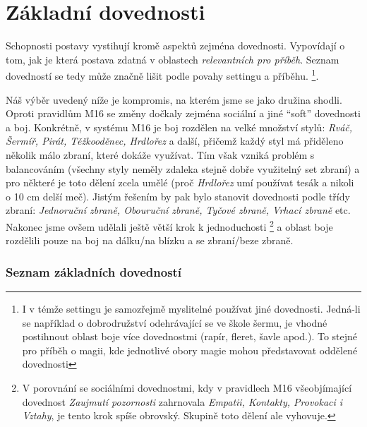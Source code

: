 \chapter{Základní dovednosti}
\label{chap:dovednosti}

Schopnosti postavy vystihují kromě aspektů zejména dovednosti. Vypovídají o tom, jak je která postava zdatná v oblastech \textit{relevantních pro příběh}. Seznam dovedností se tedy může značně lišit podle povahy settingu a příběhu. \footnote{I v témže settingu je samozřejmě myslitelné používat jiné dovednosti. Jedná-li se například o dobrodružství odehrávající se ve škole šermu, je vhodné postihnout oblast boje více dovednostmi (rapír, fleret, šavle apod.). To stejné pro příběh o magii, kde jednotlivé obory magie mohou představovat oddělené dovednosti}.

Náš výběr uvedený níže je kompromis, na kterém jsme se jako družina shodli. Oproti pravidlům M16 se změny dočkaly zejména sociální a jiné ``soft'' dovednosti a boj. Konkrétně, v systému M16 je boj rozdělen na velké množství stylů: \textit{Rváč, Šermíř, Pirát, Těžkooděnec, Hrdlořez} a další, přičemž každý styl má přiděleno několik málo zbraní, které dokáže využívat. Tím však vzniká problém s balancováním (všechny styly neměly zdaleka stejně dobře využitelný set zbraní) a pro některé je toto dělení zcela umělé (proč \textit{Hrdlořez} umí používat tesák a nikoli o 10 cm delší meč). Jistým řešením by pak bylo stanovit dovednosti podle třídy zbraní: \textit{Jednoruční zbraně, Obouruční zbraně, Tyčové zbraně, Vrhací zbraně} etc. Nakonec jsme ovšem udělali ještě větší krok k jednoduchosti \footnote{V porovnání se sociálními dovednostmi, kdy v pravidlech M16 všeobjímající dovednost \textit{Zaujmutí pozornosti} zahrnovala \textit{Empatii, Kontakty, Provokaci i Vztahy}, je tento krok spíše obrovský. Skupině toto dělení ale vyhovuje.} a oblast boje rozdělili pouze na boj na dálku/na blízku a se zbraní/beze zbraně.


\subsection{Seznam základních dovedností}
\label{sec:seznam-dov}

